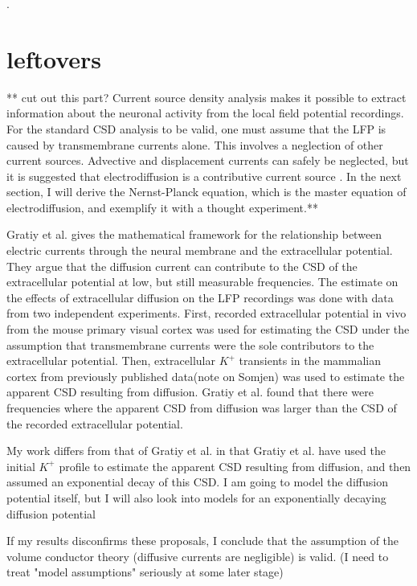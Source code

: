 \documentclass{article}
\begin{document}
 

. 
\section{leftovers}

** cut out this part?
Current source density analysis makes it possible to extract information about the neuronal activity from the local field potential recordings. For the standard CSD analysis to be valid, one must assume that the LFP is caused by transmembrane currents alone. This involves a neglection of other current sources. Advective and displacement currents can safely be neglected, but it is suggested that electrodiffusion is a contributive current source \cite{Gratiy2017}. In the next section, I will derive the Nernst-Planck equation, which is the master equation of electrodiffusion, and exemplify it with a thought experiment.**

Gratiy et al.\cite{Gratiy2017} gives the mathematical framework for the relationship between electric currents through the neural membrane and the extracellular potential. They argue that the diffusion current can contribute to the CSD of the extracellular potential at low, but still measurable frequencies. The estimate on the effects of extracellular diffusion on the LFP recordings was done with data from two independent experiments. First, recorded extracellular potential in vivo from the mouse primary visual cortex was used for estimating the CSD under the assumption that transmembrane currents were the sole contributors to the extracellular potential. Then, extracellular $K^+$ transients in the mammalian cortex from previously published data(note on Somjen) was used to estimate the apparent CSD resulting from diffusion. Gratiy et al. found that there were frequencies where the apparent CSD from diffusion was larger than the CSD of the recorded extracellular potential.

 My work differs from that of Gratiy et al. in that Gratiy et al. have used the initial $K^+$ profile to estimate the apparent CSD resulting from diffusion, and then assumed an exponential decay of this CSD. I am going to model the diffusion potential itself, but I will also look into models for an exponentially decaying diffusion potential

If my results disconfirms these proposals, I conclude that the assumption of the volume conductor theory (diffusive currents are negligible) is valid. 
(I need to treat "model assumptions" seriously at some later stage)
\end{document}
